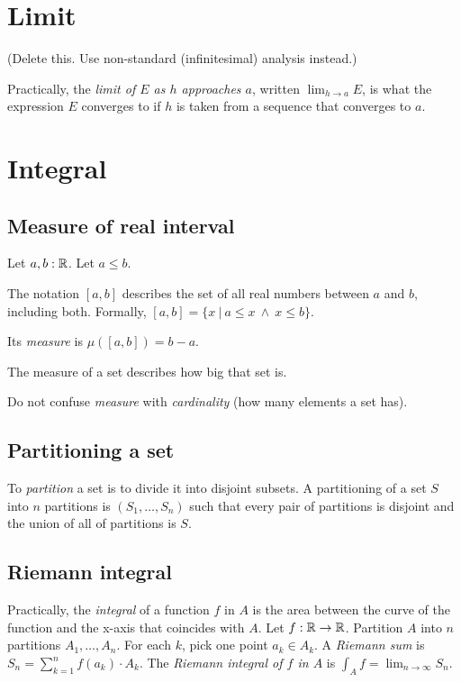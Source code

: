 \section{Limit}

(Delete this. Use non-standard (infinitesimal) analysis instead.)

%
Practically,
the \emph{limit of \(E\) as \(h\) approaches \(a\)}, written \( \lim_{h \to a} E \),
is what the expression \( E \) converges to
if \(h\) is taken from a sequence that converges to \(a\).

\section{Integral}

\subsection{Measure of real interval}

Let \( a, b: \mathbb{R} \).
Let \(a \le b\).

The notation \( [a,b] \) describes the set of all real numbers between \(a\) and \(b\), including both.
Formally, \( [a,b] = \{ x ~|~ a \le x ~\wedge~ x \le b \} \).

%
Its \emph{measure} is \( \mu([a,b]) = b - a \).

The measure of a set describes how big that set is.

Do not confuse \emph{measure} with \emph{cardinality} (how many elements a set has).

\subsection{Partitioning a set}

%
To \emph{partition} a set is to divide it into disjoint subsets.
A partitioning of a set \(S\) into \(n\) partitions is \((S_1,\ldots,S_n)\) such that
every pair of partitions is disjoint and the union of all of partitions is \(S\).

\subsection{Riemann integral}

%
Practically, the \emph{integral} of a function \(f\) in \(A\)
is the area between the curve of the function and the x-axis that coincides with \(A\).
Let \( f : \mathbb{R} \to \mathbb{R} \).
Partition \(A\) into \(n\) partitions \(A_1,\ldots,A_n\).
For each \(k\), pick one point \(a_k \in A_k\).
%
A \emph{Riemann sum} is \( S_n = \sum_{k=1}^n f(a_k) \cdot A_k \).
%
The \emph{Riemann integral of \(f\) in \(A\)} is
\( \int_A f = \lim_{n \to \infty} S_n \).


